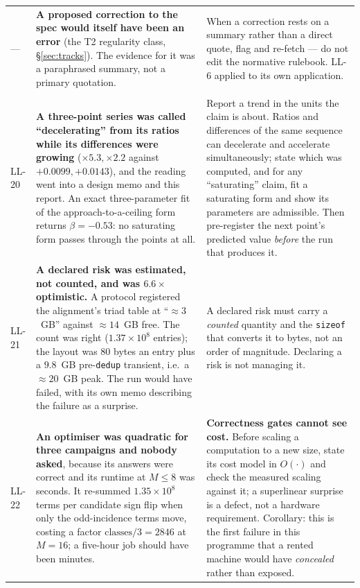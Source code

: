 \documentclass[11pt,a4paper]{article}
\theoremstyle{definition}
\theoremstyle{plain}
\begin{document}
\begin{longtable}{@{}p{1.1cm}p{6.3cm}p{7.0cm}@{}}
\addlinespace
--- & \textbf{A proposed correction to the spec would itself have been an error} (the T2 regularity class, \S\ref{sec:tracks}). The evidence for it was a paraphrased summary, not a primary quotation. & When a correction rests on a summary rather than a direct quote, flag and re-fetch --- do not edit the normative rulebook. LL-6 applied to its own application. \\
\addlinespace
\multicolumn{3}{@{}l}{\textbf{The 2026-09-13 cycle} (\S\ref{sec:series}, \S\ref{sec:algo})}\\
\addlinespace[2pt]
LL-20 & \textbf{A three-point series was called ``decelerating'' from its ratios while its differences were growing} ($\times5.3,\times2.2$ against $+0.0099,+0.0143$), and the reading went into a design memo and this report. An exact three-parameter fit of the approach-to-a-ceiling form returns $\beta=-0.53$: no saturating form passes through the points at all. & Report a trend in the units the claim is about. Ratios and differences of the same sequence can decelerate and accelerate simultaneously; state which was computed, and for any ``saturating'' claim, fit a saturating form and show its parameters are admissible. Then pre-register the next point's predicted value \emph{before} the run that produces it. \\
\addlinespace
LL-21 & \textbf{A declared risk was estimated, not counted, and was $6.6\times$ optimistic.} A protocol registered the alignment's triad table at ``$\approx3$~GB'' against $\approx14$~GB free. The count was right ($1.37\times10^8$ entries); the layout was $80$ bytes an entry plus a $9.8$~GB pre-\texttt{dedup} transient, i.e.\ a $\approx20$~GB peak. The run would have failed, with its own memo describing the failure as a surprise. & A declared risk must carry a \emph{counted} quantity and the \texttt{sizeof} that converts it to bytes, not an order of magnitude. Declaring a risk is not managing it. \\
\addlinespace
LL-22 & \textbf{An optimiser was quadratic for three campaigns and nobody asked}, because its answers were correct and its runtime at $M\le8$ was seconds. It re-summed $1.35\times10^8$ terms per candidate sign flip when only the odd-incidence terms move, costing a factor $\text{classes}/3 = 2846$ at $M=16$; a five-hour job should have been minutes. & \textbf{Correctness gates cannot see cost.} Before scaling a computation to a new size, state its cost model in $O(\cdot)$ and check the measured scaling against it; a superlinear surprise is a defect, not a hardware requirement. Corollary: this is the first failure in this programme that a rented machine would have \emph{concealed} rather than exposed. \\

\end{longtable}
\end{document}

